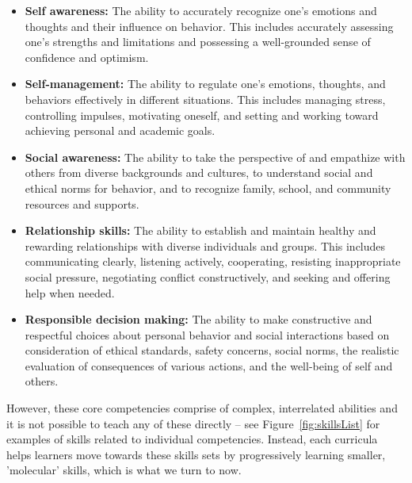 \documentclass[prodmode,acmtochi]{acmsmall}
\newcommand{\todo}[1]{\textrm{\textrm{\textcolor{LightBlue}{[[#1]]} } } }
\begin{document}
%
%
\begin{itemize}
        \item {\bf Self awareness: }
                        The ability to accurately recognize one’s emotions and thoughts and their influence on behavior. This includes accurately assessing one’s strengths and limitations and possessing a well-grounded sense of confidence and optimism.
        \item {\bf Self-management: }
                         The ability to regulate one’s emotions, thoughts, and behaviors effectively in different situations. This includes managing stress, controlling impulses, motivating oneself, and setting and working toward achieving personal and academic goals.
        \item {\bf Social awareness: }
                         The ability to take the perspective of and empathize with others from diverse backgrounds and cultures, to understand social and ethical norms for behavior, and to recognize family, school, and community resources and supports.
        \item {\bf Relationship skills: }
                        The ability to establish and maintain healthy and rewarding relationships with diverse individuals and groups. This includes communicating clearly, listening actively, cooperating, resisting inappropriate social pressure, negotiating conflict constructively, and seeking and offering help when needed.
        \item {\bf Responsible decision making: }
                        The ability to make constructive and respectful choices about personal behavior and social interactions based on consideration of ethical standards, safety concerns, social norms, the realistic evaluation of consequences of various actions, and the well-being of self and others.
\end{itemize}
However, these core competencies comprise of complex, interrelated abilities and it is not possible to teach any of these directly -- see Figure~\ref{fig:skillsList} for examples of skills related to individual competencies. 
Instead, each curricula helps learners move towards these skills sets by progressively learning smaller, 'molecular' skills, which is what we turn to now. %
\end{document}
